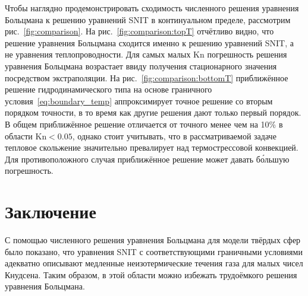 \documentclass[10pt]{article}
\newcommand{\Kn}{\mathrm{Kn}}
\begin{document}
Чтобы наглядно продемонстрировать сходимость численного решения уравнения Больцмана к
решению уравнений SNIT в континуальном пределе, рассмотрим рис.~\ref{fig:comparison}.
На рис.~\ref{fig:comparison:topT} отчётливо видно, что решение уравнения Больцмана сходится
именно к решению уравнений SNIT, а не уравнения теплопроводности.
Для самых малых \(\Kn\) погрешность решения уравнения Больцмана возрастает
ввиду получения стационарного значения посредством экстраполяции.
На рис.~\ref{fig:comparison:bottomT} приближённое решение гидродинамического типа
на основе граничного условия~\eqref{eq:boundary_temp} аппроксимирует
точное решение со вторым порядком точности,
в то время как другие решения дают только первый порядок.
В общем приближённое решение отличается от точного менее чем на 10\% в области \(\Kn<0.05\),
однако стоит учитывать, что в рассматриваемой задаче тепловое скольжение значительно превалирует
над термострессовой конвекцией. Для противоположного случая приближённое решение может давать
б\'{о}льшую погрешность.

\section{Заключение}

С помощью численного решения уравнения Больцмана для модели твёрдых сфер было показано,
что уравнения SNIT с соответствующими граничными условиями адекватно описывают
медленные неизотермические течения газа для малых чисел Кнудсена.
Таким образом, в этой области можно избежать трудоёмкого решения уравнения Больцмана.

\printbibliography
\end{document}
